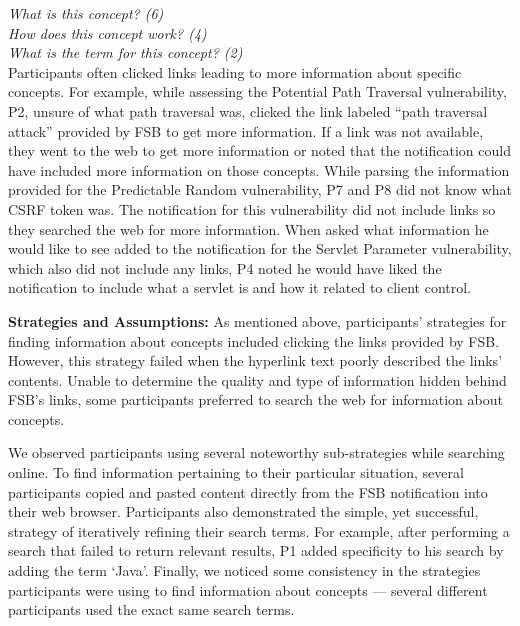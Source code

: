 \documentclass[10pt,journal,compsoc]{IEEEtran}
\begin{document}
\noindent\emph{What is this concept? (6)} \\
\emph{How does this concept work? (4)} \\
\emph{What is the term for this concept? (2)}
\\


Participants often clicked links leading to more information about specific concepts.
For example, while assessing the Potential Path Traversal vulnerability, P2, unsure of what path traversal was, clicked the link labeled ``path traversal attack'' provided by FSB to get more information.
If a link was not available, they went to the web to get more information or noted that the notification could have included more information on those concepts.
While parsing the information provided for the Predictable Random vulnerability, P7 and P8 did not know what CSRF token was.
The notification for this vulnerability did not include links so they searched the web for more information. 
When asked what information he would like to see added to the notification for the Servlet Parameter vulnerability, which also did not include any links, P4 noted he would have liked the notification to include what a servlet is and how it related to client control.


\textbf{Strategies and Assumptions:}
As mentioned above, participants' strategies for finding information about concepts included clicking the links provided by FSB.
However, this strategy failed when the hyperlink text poorly described the links' contents.
Unable to determine the quality and type of information hidden behind FSB's links, some participants preferred to search the web for information about concepts.

We observed participants using several noteworthy sub-strategies while searching online.
To find information pertaining to their particular situation, several participants copied and pasted content directly from the FSB notification into their web browser.
Participants also demonstrated the simple, yet successful, strategy of iteratively refining their search terms. 
For example, after performing a search that failed to return relevant results, P1 added specificity to his search by adding the term `Java'.
Finally, we noticed some consistency in the strategies participants were using to find information about concepts --- several different participants used the exact same search terms. 
\end{document}
